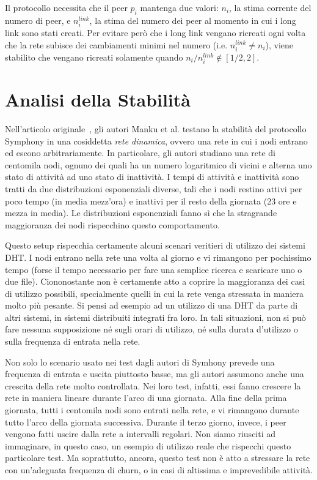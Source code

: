 \documentclass[prodmode,acmtap]{acmlarge}
\begin{document}
Il protocollo necessita che il peer $p_i$ mantenga due valori: $n_i$, la stima corrente del numero di peer, e $n^{link}_i$, la stima del numero dei peer al momento in cui i long link sono stati creati. Per evitare però che i long link vengano ricreati ogni volta che la rete subisce dei cambiamenti minimi nel numero (i.e. $n^{link}_i \neq n_i$), viene stabilito che vengano ricreati solamente quando $n_i / n^{link}_i \notin [1/2,2]$.

\section{Analisi della Stabilità} \label{stabilita}

Nell'articolo originale~\cite{symphony}, gli autori Manku et al. testano la stabilità del protocollo Symphony in una cosiddetta \emph{rete dinamica}, ovvero una rete in cui i nodi entrano ed escono arbitrariamente. In particolare, gli autori studiano una rete di centomila nodi, ognuno dei quali ha un numero logaritmico di vicini e alterna uno stato di attività ad uno stato di inattività. I tempi di attività e inattività sono tratti da due distribuzioni esponenziali diverse, tali che i nodi restino attivi per poco tempo (in media mezz'ora) e inattivi per il resto della giornata (23 ore e mezza in media). Le distribuzioni esponenziali fanno sì che la stragrande maggioranza dei nodi rispecchino questo comportamento.

Questo setup rispecchia certamente alcuni scenari veritieri di utilizzo dei sistemi DHT. I nodi entrano nella rete una volta al giorno e vi rimangono per pochissimo tempo (forse il tempo necessario per fare una semplice ricerca e scaricare uno o due file). Ciononostante non è certamente atto a coprire la maggioranza dei casi di utilizzo possibili, specialmente quelli in cui la rete venga stressata in maniera molto più pesante. Si pensi ad esempio ad un utilizzo di una DHT da parte di altri sistemi, in sistemi distribuiti integrati fra loro. In tali situazioni, non si può fare nessuna supposizione né sugli orari di utilizzo, né sulla durata d'utilizzo o sulla frequenza di entrata nella rete.

Non solo lo scenario usato nei test dagli autori di Symhony prevede una frequenza di entrata e uscita piuttosto basse, ma gli autori assumono anche una crescita della rete molto controllata. Nei loro test, infatti, essi fanno crescere la rete in maniera lineare durante l'arco di una giornata. Alla fine della prima giornata, tutti i centomila nodi sono entrati nella rete, e vi rimangono durante tutto l'arco della giornata successiva. Durante il terzo giorno, invece, i peer vengono fatti uscire dalla rete a intervalli regolari. Non siamo riusciti ad immaginare, in questo caso, un esempio di utilizzo reale che rispecchi questo particolare test. Ma soprattutto, ancora, questo test non è atto a stressare la rete con un'adeguata frequenza di churn, o in casi di altissima e imprevedibile attività.
\end{document}
